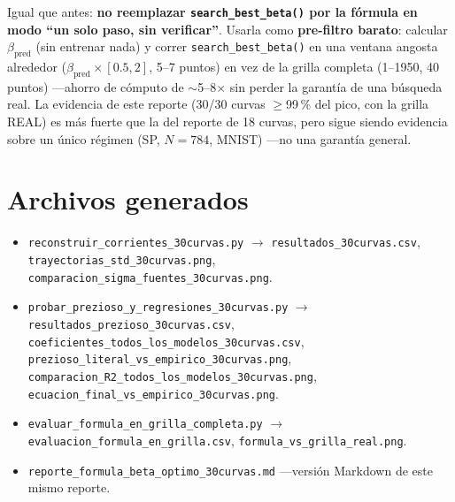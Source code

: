 \documentclass[11pt]{article}
\begin{document}
Igual que antes: \textbf{no reemplazar \texttt{search\_best\_beta()} por
la fórmula en modo ``un solo paso, sin verificar''}. Usarla como
\textbf{pre-filtro barato}: calcular $\beta_{\text{pred}}$ (sin entrenar
nada) y correr \texttt{search\_best\_beta()} en una ventana angosta
alrededor ($\beta_{\text{pred}}\times[0.5,2]$, 5--7 puntos) en vez de la
grilla completa (1--1950, 40 puntos) —ahorro de cómputo de $\sim$5--8$\times$
sin perder la garantía de una búsqueda real. La evidencia de este reporte
(30/30 curvas $\geq$99\,\% del pico, con la grilla REAL) es más fuerte que
la del reporte de 18 curvas, pero sigue siendo evidencia sobre un único
régimen (SP, $N=784$, MNIST) —no una garantía general.

\section{Archivos generados}

\begin{itemize}
\item \texttt{reconstruir\_corrientes\_30curvas.py} $\to$
  \texttt{resultados\_30curvas.csv}, \texttt{trayectorias\_std\_30curvas.png},
  \texttt{comparacion\_sigma\_fuentes\_30curvas.png}.
\item \texttt{probar\_prezioso\_y\_regresiones\_30curvas.py} $\to$
  \texttt{resultados\_prezioso\_30curvas.csv},
  \texttt{coeficientes\_todos\_los\_modelos\_30curvas.csv},
  \texttt{prezioso\_literal\_vs\_empirico\_30curvas.png},
  \texttt{comparacion\_R2\_todos\_los\_modelos\_30curvas.png},
  \texttt{ecuacion\_final\_vs\_empirico\_30curvas.png}.
\item \texttt{evaluar\_formula\_en\_grilla\_completa.py} $\to$
  \texttt{evaluacion\_formula\_en\_grilla.csv}, \texttt{formula\_vs\_grilla\_real.png}.
\item \texttt{reporte\_formula\_beta\_optimo\_30curvas.md} —versión
  Markdown de este mismo reporte.
\end{itemize}
\end{document}
